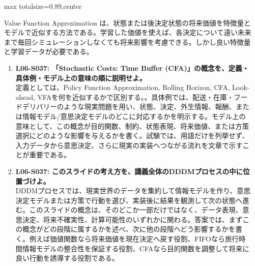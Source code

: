 \begin{minipage}[t]{0.58\textwidth}
\begin{adjustbox}{max totalsize={\textwidth}{0.89\textheight},center}
\begin{minipage}{\textwidth}
Value Function Approximation は、状態または後決定状態の将来価値を特徴量とモデルで近似する方法である。学習した価値を使えば、各決定について遠い未来まで毎回シミュレーションしなくても将来影響を考慮できる。しかし良い特徴量と学習データが必要である。\par{}\begin{enumerate}\item \textbf{L06-S037: 「Stochastic Costs: Time Buffer (CFA)」の概念を、定義・具体例・モデル上の意味の順に説明せよ。}\\定義としては、Policy Function Approximation, Rolling Horizon, CFA, Look-ahead, VFAを何を近似するかで区別する。。具体例では、配送・在庫・フードデリバリーのような現実問題を用い、状態、決定、外生情報、報酬、または情報モデル/意思決定モデルのどこに対応するかを明示する。モデル上の意味として、この概念が目的関数、制約、状態表現、将来価値、または方策選択にどのような影響を与えるかを書く。試験では、用語だけを列挙せず、入力データから意思決定、さらに現実の実装へつながる流れを文章で示すことが重要である。\item \textbf{L06-S037: このスライドの考え方を、講義全体のDDDMプロセスの中に位置づけよ。}\\DDDMプロセスでは、現実世界のデータを集約して情報モデルを作り、意思決定モデルまたは方策で行動を選び、実装後に結果を観測して次の状態へ進む。このスライドの概念は、そのどこか一部だけではなく、データ表現、意思決定、将来不確実性、計算可能性のいずれかに関わる。答案では、まずこの概念がどの段階に属するかを述べ、次に他の段階へどう影響するかを書く。例えば価値関数なら将来価値を現在決定へ戻す役割、FIFOなら旅行時間情報モデルの整合性を保証する役割、CFAなら目的関数を調整して将来に良い行動を誘導する役割である。\end{enumerate}
\end{minipage}
\end{adjustbox}
\end{minipage}


